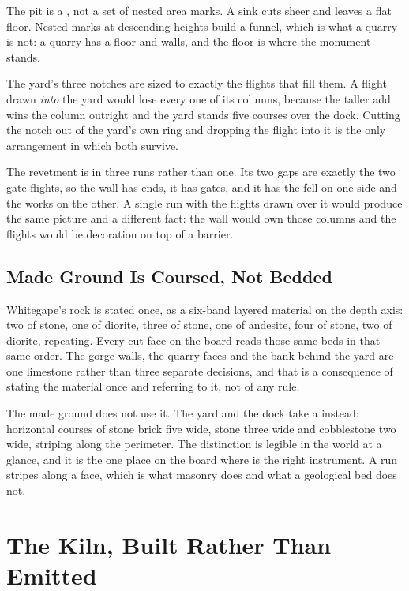 The pit is a , not a set of nested area marks. A sink cuts sheer and
leaves a flat floor. Nested marks at descending heights build a funnel, which is
what a quarry is not: a quarry has a floor and walls, and the floor is where
the monument stands.

The yard's three notches are sized to exactly the flights that fill them. A
flight drawn \emph{into} the yard would lose every one of its columns, because
the taller add wins the column outright and the yard stands five courses over
the dock. Cutting the notch out of the yard's own ring and dropping the flight
into it is the only arrangement in which both survive.

The revetment is in three runs rather than one. Its two gaps are exactly the
two gate flights, so the wall has ends, it has gates, and it has the fell on
one side and the works on the other. A single run with the flights drawn over
it would produce the same picture and a different fact: the wall would own
those columns and the flights would be decoration on top of a barrier.

\subsection{Made Ground Is Coursed, Not Bedded}

Whitegape's rock is stated once, as a six-band layered material on the depth
axis: two of stone, one of diorite, three of stone, one of andesite, four of
stone, two of diorite, repeating. Every cut face on the board reads those same
beds in that same order. The gorge walls, the quarry faces and the bank behind
the yard are one limestone rather than three separate decisions, and that is a
consequence of stating the material once and referring to it, not of any rule.

The made ground does not use it. The yard and the dock take a 
instead: horizontal courses of stone brick five wide, stone three wide and
cobblestone two wide, striping along the perimeter. The distinction is
legible in the world at a glance, and it is the one place on the board where
 is the right instrument. A run stripes along a face, which is what
masonry does and what a geological bed does not.

\section{The Kiln, Built Rather Than Emitted}

